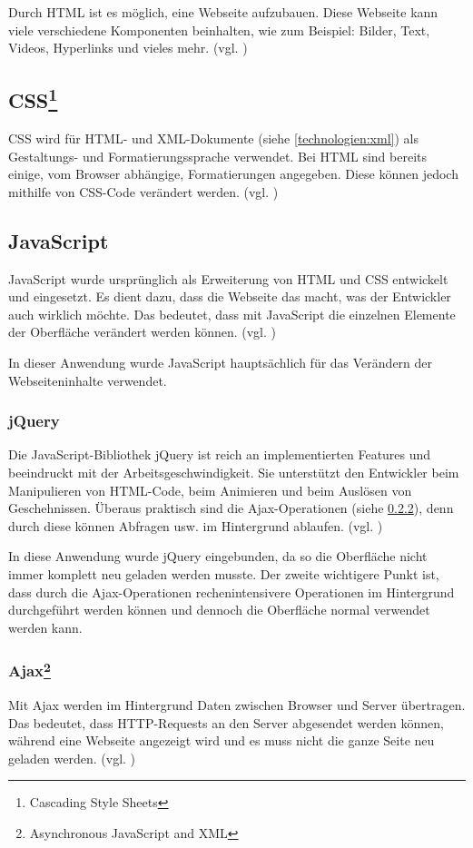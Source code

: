 Durch HTML ist es möglich, eine Webseite aufzubauen. Diese Webseite kann viele verschiedene Komponenten beinhalten, wie zum Beispiel: Bilder, Text, Videos, Hyperlinks und vieles mehr. (vgl. \cite{html5})

\subsection[CSS]{CSS\footnote{Cascading Style Sheets}}
\label{technologien:css}
CSS wird für HTML- und XML-Dokumente (siehe \ref{technologien:xml}) als Gestaltungs- und Formatierungssprache verwendet. Bei HTML sind bereits einige, vom Browser abhängige, Formatierungen angegeben. Diese können jedoch mithilfe von CSS-Code verändert werden. (vgl. \cite{css})

\subsection{JavaScript}
\label{technologien:javascript}
JavaScript wurde ursprünglich als Erweiterung von HTML und CSS entwickelt und eingesetzt. Es dient dazu, dass die Webseite das macht, was der Entwickler auch wirklich möchte. Das bedeutet, dass mit JavaScript die einzelnen Elemente der Oberfläche verändert werden können. (vgl. \cite{javascript})

In dieser Anwendung wurde JavaScript hauptsächlich für das Verändern der Webseiteninhalte verwendet.

\subsubsection{jQuery}
Die JavaScript-Bibliothek jQuery ist reich an implementierten Features und beeindruckt mit der Arbeitsgeschwindigkeit. Sie unterstützt den Entwickler beim Manipulieren von HTML-Code, beim Animieren und beim Auslösen von Geschehnissen. Überaus praktisch sind die Ajax-Operationen (siehe \ref{technologien:ajax}), denn durch diese können Abfragen usw. im Hintergrund ablaufen. (vgl. \cite{jquery})

In diese Anwendung wurde jQuery eingebunden, da so die Oberfläche nicht immer komplett neu geladen werden musste. Der zweite wichtigere Punkt ist, dass durch die Ajax-Operationen rechenintensivere Operationen im Hintergrund durchgeführt werden können und dennoch die Oberfläche normal verwendet werden kann.

\subsubsection[Ajax]{Ajax\footnote{Asynchronous JavaScript and XML}}
\label{technologien:ajax}
Mit Ajax werden im Hintergrund Daten zwischen Browser und Server übertragen. Das bedeutet, dass HTTP-Requests an den Server abgesendet werden können, während eine Webseite angezeigt wird und es muss nicht die ganze Seite neu geladen werden. (vgl. \cite{ajax})

